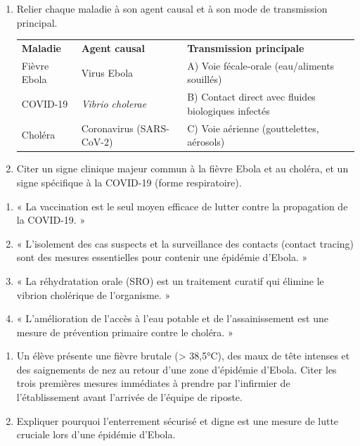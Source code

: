 \documentclass[11pt]{article}
\begin{document}
\begin{exercice}
\begin{enumerate}
    \item Relier chaque maladie à son agent causal et à son mode de transmission principal.
    \begin{tabular}{lll}
    \textbf{Maladie} & \textbf{Agent causal} & \textbf{Transmission principale} \\
    Fièvre Ebola & Virus Ebola & A) Voie fécale-orale (eau/aliments souillés) \\
    COVID-19 & \textit{Vibrio cholerae} & B) Contact direct avec fluides biologiques infectés \\
    Choléra & Coronavirus (SARS-CoV-2) & C) Voie aérienne (gouttelettes, aérosols) \\
    \end{tabular}
    \item Citer un signe clinique majeur commun à la fièvre Ebola et au choléra, et un signe spécifique à la COVID-19 (forme respiratoire).
\end{enumerate}
\end{exercice}

\begin{exercice}
\begin{enumerate}
    \item « La vaccination est le seul moyen efficace de lutter contre la propagation de la COVID-19. »
    \item « L'isolement des cas suspects et la surveillance des contacts (contact tracing) sont des mesures essentielles pour contenir une épidémie d'Ebola. »
    \item « La réhydratation orale (SRO) est un traitement curatif qui élimine le vibrion cholérique de l'organisme. »
    \item « L'amélioration de l'accès à l'eau potable et de l'assainissement est une mesure de prévention primaire contre le choléra. »
\end{enumerate}
\end{exercice}

\begin{exercice}
\begin{enumerate}
    \item Un élève présente une fièvre brutale (> 38,5°C), des maux de tête intenses et des saignements de nez au retour d'une zone d'épidémie d'Ebola. Citer les trois premières mesures immédiates à prendre par l'infirmier de l'établissement avant l'arrivée de l'équipe de riposte.
    \item Expliquer pourquoi l'enterrement sécurisé et digne est une mesure de lutte cruciale lors d'une épidémie d'Ebola.
\end{enumerate}
\end{exercice}
\end{document}
